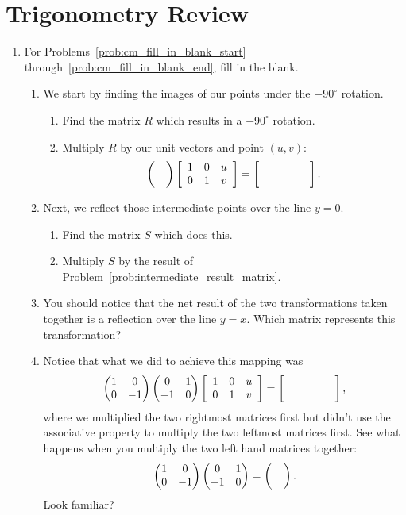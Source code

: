 \documentclass[../gatm_answers.tex]{subfiles}
\begin{document}
\section{Trigonometry Review}

\begin{enumerate}
\item For Problems~\ref{prob:cm_fill_in_blank_start} through~\ref{prob:cm_fill_in_blank_end}, fill in the blank.
\begin{enumerate}
\item We start by finding the images of our points under the $-90^\circ$ rotation. \label{prob:cm_fill_in_blank_start}
\begin{enumerate}
\item Find the matrix $R$ which results in a $-90^\circ$ rotation.
\item  \label{prob:intermediate_result_matrix} Multiply $R$ by our unit vectors and point $(u,v)$: $$\twomat{}{}{}{}\left[\begin{array}{ccc} 1 & 0 & u \\ 0 & 1 & v \end{array}\right] = \left[\phantom{\begin{array}{ccc} 1 & 0 & u \\ 0 & 1 & v \end{array}}\right].$$
\end{enumerate}
\item Next, we reflect those intermediate points over the line $y=0$.
\begin{enumerate}
\item Find the matrix $S$ which does this.
\item Multiply $S$ by the result of Problem~\ref{prob:intermediate_result_matrix}.
\end{enumerate}
\item You should notice that the net result of the two transformations taken together is a reflection over the line $y=x$. Which matrix represents this transformation? 
\item Notice that what we did to achieve this mapping was $$\twomat{1}{0}{0}{-1}\twomat{0}{1}{-1}{0}\left[\begin{array}{ccc} 1 & 0 & u \\ 0 & 1 & v \end{array}\right]=\left[\phantom{\begin{array}{ccc} 1 & 0 & u \\ 0 & 1 & v \end{array}}\right],$$
where we multiplied the two rightmost matrices first but didn't use the associative property to multiply the two leftmost matrices first. See what happens when you multiply the two left hand matrices together: $$\begin{pmatrix} 1 & 0 \\ 0 & -1 \end{pmatrix}\begin{pmatrix} 0 & 1 \\ -1 & 0 \end{pmatrix}=\begin{pmatrix}  &  \\  &  \end{pmatrix}.$$ Look familiar?

\end{enumerate}
\end{enumerate}
\end{document}
